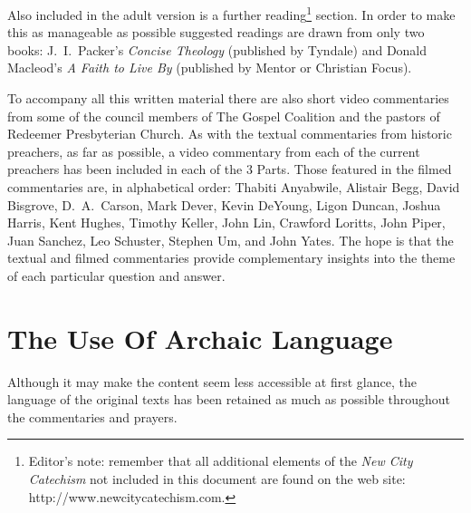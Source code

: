 \documentclass[]{memoir}
\begin{document}
Also included in the adult version is a further reading\footnote{Editor's note: remember that all additional elements of the \emph{New City Catechism}\/ not included in this document are found on the web site: http:/\slash{}www.new\hspace{0em}city\hspace{0em}cate\hspace{0em}chism.\hspace{0em}com.} section. In order to make this as manageable as possible suggested readings are drawn from only two books: J.~I.\ Packer's \emph{Concise Theology}\/ (published by Tyndale) and Donald Macleod's \emph{A Faith to Live By}\/ (published by Mentor or Christian Focus).

To accompany all this written material there are also short video commentaries from some of the council members of The Gospel Coalition and the pastors of Redeemer Presbyterian Church. As with the textual commentaries from historic preachers, as far as possible, a video commentary from each of the current preachers has been included in each of the 3 Parts. Those featured in the filmed commentaries are, in alphabetical order: Thabiti Anyabwile, Alistair Begg, David Bisgrove, D.~A.\ Carson, Mark Dever, Kevin DeYoung, Ligon Duncan, Joshua Harris, Kent Hughes, Timothy Keller, John Lin, Crawford Loritts, John Piper, Juan Sanchez, Leo Schuster, Stephen Um, and John Yates. The hope is that the textual and filmed commentaries provide complementary insights into the theme of each particular question and answer.

\section{The Use Of Archaic Language}
Although it may make the content seem less accessible at first glance, the language of the original texts has been retained as much as possible throughout the commentaries and prayers.
\end{document}

